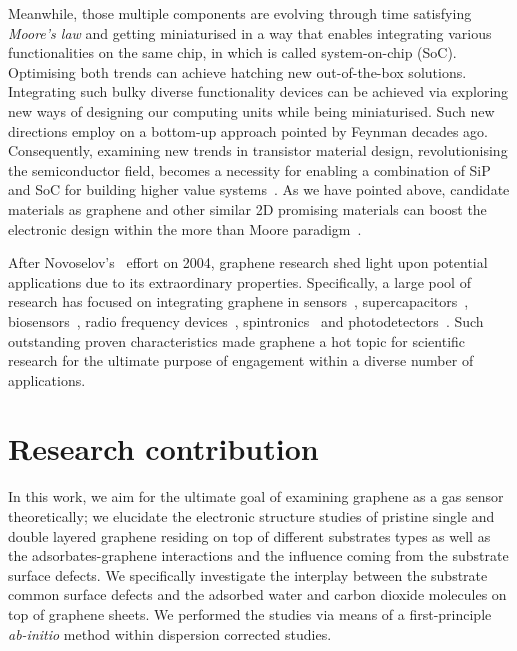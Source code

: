 Meanwhile, those multiple components are evolving through time satisfying \textit{Moore's law} and getting miniaturised in a way that enables integrating various functionalities on the same chip, in which is called system-on-chip (SoC). Optimising both trends can achieve hatching new out-of-the-box solutions. Integrating such bulky diverse functionality devices can be achieved via exploring new ways of designing our computing units while being miniaturised. Such new directions employ on a bottom-up approach pointed by Feynman decades ago. Consequently, examining new trends in transistor material design, revolutionising the semiconductor field, becomes a necessity for enabling a combination of SiP and SoC for building higher value systems~\cite{Lemme2012}. As we have pointed above, candidate materials as graphene and other similar 2D promising materials can boost the electronic design within the more than Moore paradigm~\cite{Fiori2014nature, Fiori2015}.

After Novoselov's~\cite{Novoselov2004} effort on 2004, graphene research shed light upon potential applications due to its extraordinary properties. Specifically, a large pool of research has focused on integrating graphene in sensors~\cite{Lee2008, Geim2009, Smith2015, Smith2017}, supercapacitors~\cite{Liu2010, Yoo2011, Brownson2012}, biosensors~\cite{Shao2010, He2010}, radio frequency devices~\cite{Moon2009, Koswatta2011}, spintronics~\cite{Han2014} and photodetectors~\cite{Mueller2010, Lemme2011}. Such outstanding proven characteristics made graphene a hot topic for scientific research for the ultimate purpose of engagement within a diverse number of applications. 
%
%
\section{Research contribution}
In this work, we aim for the ultimate goal of examining graphene as a gas sensor theoretically; we elucidate the electronic structure studies of pristine single and double layered graphene residing on top of different substrates types as well as the adsorbates-graphene interactions and the influence coming from the substrate surface defects. We specifically investigate the interplay between the substrate common surface defects and the adsorbed water and carbon dioxide molecules on top of graphene sheets. We performed the studies via means of a first-principle \textit{ab-initio} method within dispersion corrected studies.
%
%
